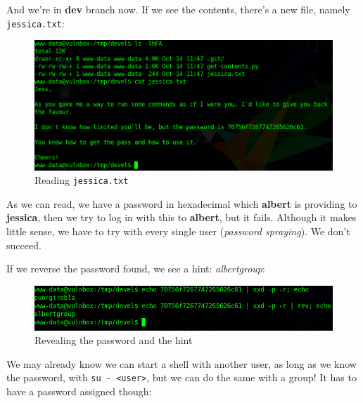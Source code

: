 \documentclass[12pt]{article}
\begin{document}
    And we're in \textbf{dev} branch now. If we see the contents, there's a new
    file, namely \texttt{jessica.txt}:

    \begin{figure}[H]\label{pic:45-cat-jessica}
        \centering
        \includegraphics[width=1.00\textwidth]{45-cat-jessica.png}
        \caption{Reading \texttt{jessica.txt}}
    \end{figure}

    As we can read, we have a password in hexadecimal which \textbf{albert} is 
    providing to \textbf{jessica}, then we try to log in with this to 
    \textbf{albert}, but it fails. Although it makes little sense, we have to 
    try with every single user (\textit{password spraying}). We don't succeed.

    If we reverse the password found, we see a hint: \textit{albertgroup}:

    \begin{figure}[H]\label{pic:46-xxd-password}
        \centering
        \includegraphics[width=1.00\textwidth]{46-xxd-password.png}
        \caption{Revealing the password and the hint}
    \end{figure}

    We may already know we can start a shell with another user, as long as we
    know the password, with \verb!su - <user>!, but we can do the same with a
    group! It has to have a password assigned though:
\end{document}
